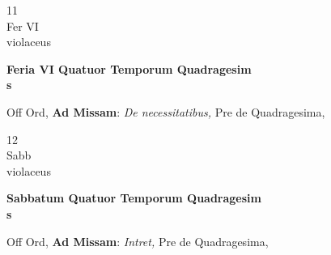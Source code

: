 \documentclass[10pt, openany]{book}
\begin{document}
        \begin{center}
            \begin{minipage}{3.5in}
                \vspace{2em}
                \begin{minipage}{0.5in}
                    {\Huge 11} \\
                    {\normalsize Fer VI} \\
                    {\normalsize violaceus}
                \end{minipage}
                \begin{minipage}{3.0in}
                    \textbf{ \large Feria VI Quatuor Temporum Quadragesim \\
                    \textnormal{\normalsize s}} \\ 
                \end{minipage}
                \begin{justify}Off Ord, \textbf{Ad Missam}: \textit{De necessitatibus,} Pre de Quadragesima,   
                \end{justify}
            \end{minipage}
        \end{center}
    
        \begin{center}
            \begin{minipage}{3.5in}
                \vspace{2em}
                \begin{minipage}{0.5in}
                    {\Huge 12} \\
                    {\normalsize Sabb} \\
                    {\normalsize violaceus}
                \end{minipage}
                \begin{minipage}{3.0in}
                    \textbf{ \large Sabbatum Quatuor Temporum Quadragesim \\
                    \textnormal{\normalsize s}} \\ 
                \end{minipage}
                \begin{justify}Off Ord, \textbf{Ad Missam}: \textit{Intret,} Pre de Quadragesima,   
                \end{justify}
            \end{minipage}
        \end{center}
    
\end{document}
